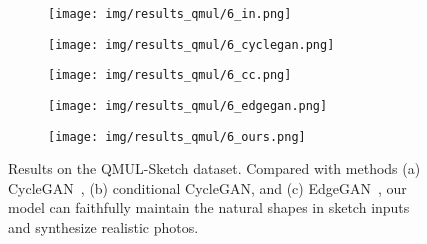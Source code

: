 \documentclass[10pt,twocolumn,letterpaper]{article}
\begin{document}
\begin{figure}[htbp]
\begin{center}
  \begin{subfigure}[b]{\qmulwidth\linewidth}
  \texttt{[image: img/results\_qmul/6\_in.png]}
  \end{subfigure}
  \begin{subfigure}[b]{\qmulwidth\linewidth}
  \texttt{[image: img/results\_qmul/6\_cyclegan.png]}
  \end{subfigure}
  \begin{subfigure}[b]{\qmulwidth\linewidth}
  \texttt{[image: img/results\_qmul/6\_cc.png]}
  \end{subfigure}
\begin{subfigure}[b]{\qmulwidth\linewidth}
  \texttt{[image: img/results\_qmul/6\_edgegan.png]}
  \end{subfigure}
  \begin{subfigure}[b]{\qmulwidth\linewidth}
  \texttt{[image: img/results\_qmul/6\_ours.png]}
  \end{subfigure}
\end{center}
\caption{Results on the QMUL-Sketch dataset. Compared with methods (a) CycleGAN~\cite{zhu2017unpaired}, (b) conditional CycleGAN, and (c) EdgeGAN~\cite{gao2020sketchycoco}, our model can faithfully maintain the natural shapes in sketch inputs and synthesize realistic photos.}
 \label{fig:qmul_results}
\end{figure}
\end{document}
